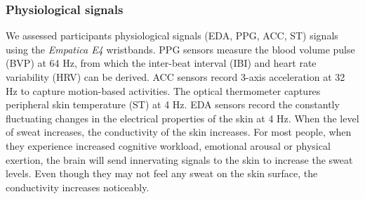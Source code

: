 \documentclass[sigconf]{acmart}
\begin{document}
\begin{comment}
\begin{figure}
    \centering
    \texttt{[image: image/EDA.png]}
    \caption{Graphical representation of EDA components}
    \label{fig:edaexample}
\end{figure}
\end{comment}
\subsubsection{Physiological signals}

We assessed participants physiological signals (EDA, PPG, ACC, ST) signals using the \textit{Empatica E4} wristbands. PPG sensors measure the blood volume pulse (BVP) at 64 Hz, from which the inter-beat interval (IBI) and heart rate variability (HRV) can be derived. ACC sensors record 3-axis acceleration at 32 Hz to capture motion-based activities. The optical thermometer captures peripheral skin temperature (ST) at 4 Hz.
EDA sensors record the constantly fluctuating changes in the electrical properties of the skin at 4 Hz. When the level of sweat increases, the conductivity of the skin increases. For most people, when they experience increased cognitive workload, emotional arousal or physical exertion, the brain will send innervating signals to the skin to increase the sweat levels. Even though they may not feel any sweat on the skin surface, the conductivity increases noticeably. 



\end{document}
